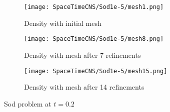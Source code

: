 \documentclass[Proposal.tex]{subfiles}
\begin{document}
\begin{figure}[p]
\begin{subfigure}[c]{0.45\textwidth}
\centering
\texttt{[image: SpaceTimeCNS/Sod1e-5/mesh1.png]}
\caption{Density with initial mesh}
\label{fig:spaceTimeCNS_mesh0}
\end{subfigure}
\begin{subfigure}[c]{0.45\textwidth}
\centering
\texttt{[image: SpaceTimeCNS/Sod1e-5/mesh8.png]}
\caption{Density with mesh after 7 refinements}
\label{fig:spaceTimeCNS_mesh7}
\end{subfigure}
\begin{subfigure}[c]{0.9\textwidth}
\centering
\texttt{[image: SpaceTimeCNS/Sod1e-5/mesh15.png]}
\caption{Density with mesh after 14 refinements}
\label{fig:spaceTimeCNS_mesh14}
\end{subfigure}

\caption{Sod problem at $t=0.2$}
\label{fig:spaceTimeCNS7}
\end{figure}

\end{document}
